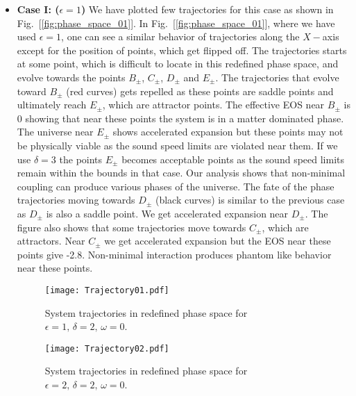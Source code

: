 \documentclass[a4paper,12pt]{article}
\begin{document}
\begin{itemize}	
\item {\textbf{Case I: ($\epsilon =1$)}} \; We have plotted few trajectories for this case as shown in Fig.~[\ref{fig:phase_space_01}]. In Fig.~[\ref{fig:phase_space_01}], where we have used $\epsilon=1$, one can  see a similar behavior of trajectories along the $X-$axis except for the position of points, which get flipped off. The trajectories starts at some point, which is difficult to locate in this redefined phase space, and evolve towards the points $B_{\pm}$, $C_{\pm}$, $D_{\pm}$ and $E_{\pm}$. The trajectories that evolve toward $B_{\pm}$ (red curves) gets repelled as these points are saddle points and ultimately reach $E_\pm$, which are attractor points. The effective EOS near $B_\pm$ is 0 showing that near these points the system is in a matter dominated phase. The universe near $E_\pm$ shows accelerated expansion but these points may not be physically viable as the sound speed limits are violated near them. If we use $\delta=3$ the points $E_\pm$ becomes acceptable points as the sound speed limits remain within the bounds in that case. Our analysis shows that non-minimal coupling can produce various phases of the universe. The fate of the phase trajectories moving towards $D_\pm$ (black curves) is similar to the previous case as $D_\pm$ is also a saddle point. We get accelerated expansion near $D_\pm$. The figure also shows that some trajectories move towards $C_\pm$, which are attractors. Near $C_\pm$ we get accelerated expansion but the EOS near these points give -2.8. Non-minimal interaction produces phantom like behavior near these points.  
\begin{figure}[t!]
\begin{minipage}[b]{0.5\linewidth}
\centering
\texttt{[image: Trajectory01.pdf]}
\caption{System trajectories in redefined phase space for $\epsilon = 1,\, \delta =2,\, \omega = 0$.} 
\label{fig:phase_space_01}
\end{minipage}
\hspace{0.2cm}
\begin{minipage}[b]{0.5\linewidth}
\centering
\texttt{[image: Trajectory02.pdf]}
\caption{System trajectories in redefined phase space for $\epsilon = 2,\, \delta =2,\, \omega = 0$.}
\label{fig:phase_space_02}
\end{minipage}
\end{figure}


\end{itemize}
\end{document}
